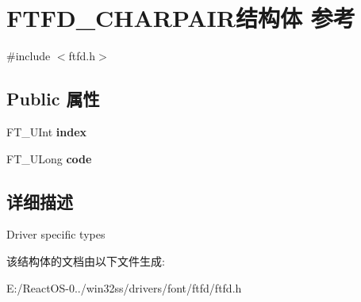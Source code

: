 \hypertarget{struct_f_t_f_d___c_h_a_r_p_a_i_r}{}\section{F\+T\+F\+D\+\_\+\+C\+H\+A\+R\+P\+A\+I\+R结构体 参考}
\label{struct_f_t_f_d___c_h_a_r_p_a_i_r}


{\ttfamily \#include $<$ftfd.\+h$>$}

\subsection*{Public 属性}
\begin{DoxyCompactItemize}
\item 
\mbox{\label{struct_f_t_f_d___c_h_a_r_p_a_i_r_aa639ad5e7ccdcd515b55a7007b4437a9}} 
F\+T\+\_\+\+U\+Int {\bfseries index}
\item 
\mbox{\label{struct_f_t_f_d___c_h_a_r_p_a_i_r_a86164dc6cd274e73f0ba28460570a298}} 
F\+T\+\_\+\+U\+Long {\bfseries code}
\end{DoxyCompactItemize}


\subsection{详细描述}
Driver specific types 

该结构体的文档由以下文件生成\+:\begin{DoxyCompactItemize}
\item 
E\+:/\+React\+O\+S-\/0../win32ss/drivers/font/ftfd/ftfd.\+h\end{DoxyCompactItemize}
